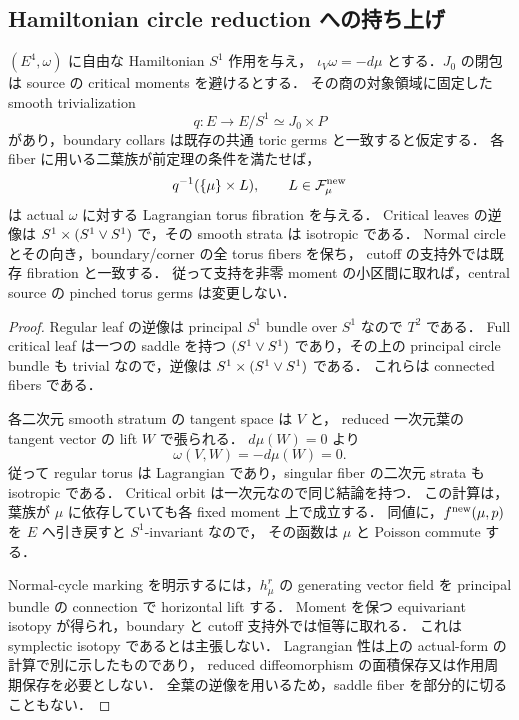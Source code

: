 \subsection{Hamiltonian circle reduction への持ち上げ}

\begin{corollary}
\label{ke:actual-saddle-moving-neck-interpolation}
$(E^4,\omega)$ に自由な Hamiltonian $S^1$ 作用を与え，
$\iota_V\omega=-d\mu$ とする．$J_0$ の閉包は source の critical moments を避けるとする．
その商の対象領域に固定した smooth trivialization
\[
 q:E\longrightarrow E/S^1\simeq J_0\times P
\]
があり，boundary collars は既存の共通 toric germs と一致すると仮定する．
各 fiber に用いる二葉族が前定理の条件を満たせば，
\[
 q^{-1}(\{\mu\}\times L),\qquad L\in\mathcal F^{\rm new}_\mu
\]
は actual $\omega$ に対する Lagrangian torus fibration を与える．
Critical leaves の逆像は $S^1\times(S^1\vee S^1)$ で，その smooth strata は isotropic である．
Normal circle とその向き，boundary/corner の全 torus fibers を保ち，
cutoff の支持外では既存 fibration と一致する．
従って支持を非零 moment の小区間に取れば，central source の pinched torus germs は変更しない．
\end{corollary}

\begin{proof}
Regular leaf の逆像は principal $S^1$ bundle over $S^1$ なので $T^2$ である．
Full critical leaf は一つの saddle を持つ $(S^1\vee S^1)$ であり，その上の principal circle
bundle も trivial なので，逆像は $S^1\times(S^1\vee S^1)$ である．
これらは connected fibers である．

各二次元 smooth stratum の tangent space は $V$ と，
reduced 一次元葉の tangent vector の lift $W$ で張られる．
$d\mu(W)=0$ より
\[
 \omega(V,W)=-d\mu(W)=0.
\]
従って regular torus は Lagrangian であり，singular fiber の二次元 strata も isotropic である．
Critical orbit は一次元なので同じ結論を持つ．
この計算は，葉族が $\mu$ に依存していても各 fixed moment 上で成立する．
同値に，$f^{\rm new}(\mu,p)$ を $E$ へ引き戻すと $S^1$-invariant なので，
その函数は $\mu$ と Poisson commute する．

Normal-cycle marking を明示するには，$h^r_\mu$ の generating vector field を
principal bundle の connection で horizontal lift する．
Moment を保つ equivariant isotopy が得られ，boundary と cutoff 支持外では恒等に取れる．
これは symplectic isotopy であるとは主張しない．
Lagrangian 性は上の actual-form の計算で別に示したものであり，
reduced diffeomorphism の面積保存又は作用周期保存を必要としない．
全葉の逆像を用いるため，saddle fiber を部分的に切ることもない．
\end{proof}


